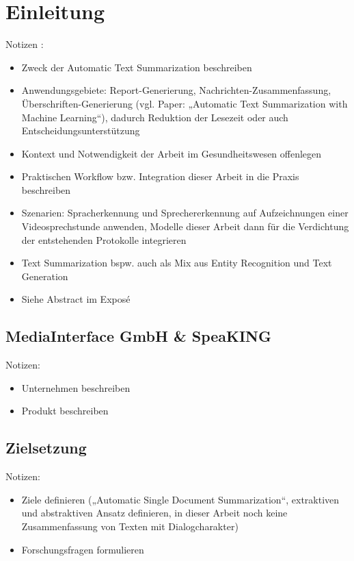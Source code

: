 \chapter{Einleitung}
\thispagestyle{fancy}
\label{chap:Einleitung}

Notizen \cite{BAC15}:
\begin{itemize}
	\item Zweck der Automatic Text Summarization beschreiben
	\item Anwendungsgebiete: Report-Generierung, Nachrichten-Zusammenfassung, Überschriften-Generierung (vgl. Paper: „Automatic Text Summarization with Machine Learning“), dadurch Reduktion der Lesezeit oder auch Entscheidungsunterstützung
	\item Kontext und Notwendigkeit der Arbeit im Gesundheitswesen offenlegen
	\item Praktischen Workflow bzw. Integration dieser Arbeit in die Praxis beschreiben
	\item Szenarien: Spracherkennung und Sprechererkennung auf Aufzeichnungen einer Videosprechstunde anwenden, Modelle dieser Arbeit dann für die Verdichtung der entstehenden Protokolle integrieren
	\item Text Summarization bspw. auch als Mix aus Entity Recognition und Text Generation
	\item Siehe Abstract im Exposé
\end{itemize}


\section{MediaInterface GmbH \& SpeaKING\textsuperscript{\textregistered}}
Notizen:
\begin{itemize}
	\item Unternehmen beschreiben
	\item Produkt beschreiben
\end{itemize}


\section{Zielsetzung}
Notizen:
\begin{itemize}
	\item Ziele definieren („Automatic Single Document Summarization“, extraktiven und abstraktiven Ansatz definieren, in dieser Arbeit noch keine Zusammenfassung von Texten mit Dialogcharakter)
	\item Forschungsfragen formulieren
\end{itemize}


